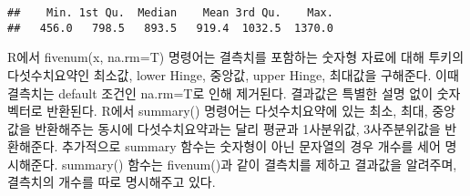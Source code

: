 \documentclass[]{article}
\begin{document}
\begin{verbatim}
##    Min. 1st Qu.  Median    Mean 3rd Qu.    Max. 
##   456.0   798.5   893.5   919.4  1032.5  1370.0
\end{verbatim}

R에서 fivenum(x, na.rm=T) 명령어는 결측치를 포함하는 숫자형 자료에 대해
투키의 다섯수치요약인 최소값, lower Hinge, 중앙값, upper Hinge, 최대값을
구해준다. 이때 결측치는 default 조건인 na.rm=T로 인해 제거된다. 결과값은
특별한 설명 없이 숫자 벡터로 반환된다. R에서 summary() 명령어는
다섯수치요약에 있는 최소, 최대, 중앙값을 반환해주는 동시에
다섯수치요약과는 달리 평균과 1사분위값, 3사주분위값을 반환해준다.
추가적으로 summary 함수는 숫자형이 아닌 문자열의 경우 개수를 세어
명시해준다. summary() 함수는 fivenum()과 같이 결측치를 제하고 결과값을
알려주며, 결측치의 개수를 따로 명시해주고 있다.
\end{document}
